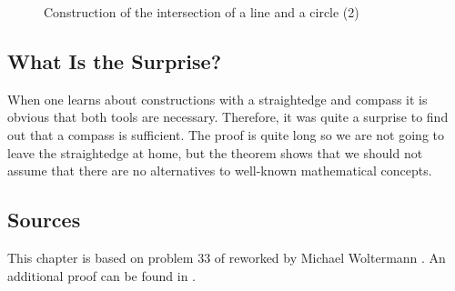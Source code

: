\begin{figure}[b]
\begin{center}
\end{center}
\caption{Construction of  the intersection of a line and a circle (2)}\label{f.compass-circle5}
\end{figure}

\newpage

\subsection*{What Is the Surprise?}

When one learns about constructions with a straightedge and compass it is obvious that both tools are necessary. Therefore,  it was quite a surprise to find out that a compass is sufficient. The proof is quite long so we are not going to leave the straightedge at home, but the theorem shows that we should not assume that there are no alternatives to well-known mathematical concepts.

\subsection*{Sources}

This chapter is based on problem $33$ of \cite{dorrie1} reworked by Michael Woltermann \cite{dorrie2}. An additional proof can be found in \cite{mm}.
